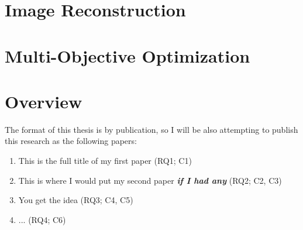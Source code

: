 \section{Image Reconstruction} \label{sec:back}

\section{Multi-Objective Optimization} \label{sec:back}

\section{Overview} \label{sec:thes}
The format of this thesis is by publication, so I will be also attempting to publish this research as the following papers:
\begin{enumerate}[start=1,label={P\arabic*:},wide = 0pt, leftmargin = 3em]
	\item This is the full title of my first paper (RQ1; C1)
	\item This is where I would put my second paper \textit{\textbf{if I had any}} (RQ2; C2, C3)
	\item You get the idea (RQ3; C4, C5)
	\item ... (RQ4; C6)
\end{enumerate}

